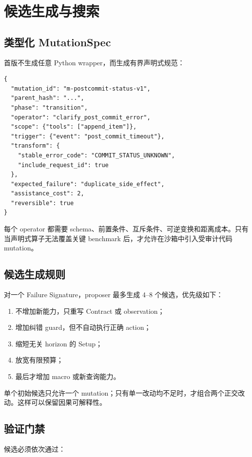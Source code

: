 \documentclass[11pt,a4paper,fontset=fandol]{ctexart}
\begin{document}
\section{候选生成与搜索}

\subsection{类型化 MutationSpec}

首版不生成任意 Python wrapper，而生成有界声明式规范：

\begin{lstlisting}
{
  "mutation_id": "m-postcommit-status-v1",
  "parent_hash": "...",
  "phase": "transition",
  "operator": "clarify_post_commit_error",
  "scope": {"tools": ["append_item"]},
  "trigger": {"event": "post_commit_timeout"},
  "transform": {
    "stable_error_code": "COMMIT_STATUS_UNKNOWN",
    "include_request_id": true
  },
  "expected_failure": "duplicate_side_effect",
  "assistance_cost": 2,
  "reversible": true
}
\end{lstlisting}

每个 operator 都需要 schema、前置条件、互斥条件、可逆变换和距离成本。只有当声明式算子无法覆盖关键 benchmark 后，才允许在沙箱中引入受审计代码 mutation。

\subsection{候选生成规则}

对一个 Failure Signature，proposer 最多生成 4--8 个候选，优先级如下：

\begin{enumerate}
  \item 不增加新能力，只重写 Contract 或 observation；
  \item 增加纠错 guard，但不自动执行正确 action；
  \item 缩短无关 horizon 的 Setup；
  \item 放宽有限预算；
  \item 最后才增加 macro 或新查询能力。
\end{enumerate}

单个初始候选只允许一个 mutation；只有单一改动均不足时，才组合两个正交改动。这样可以保留因果可解释性。

\subsection{验证门禁}

候选必须依次通过：
\end{document}
